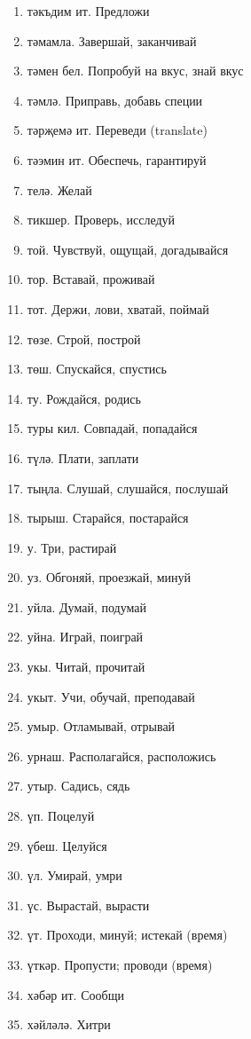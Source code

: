 \documentclass{article}
\begin{document}
\begin{enumerate}
    \item тәкъдим ит. Предложи
    \item тәмамла. Завершай, заканчивай
    \item тәмен бел. Попробуй на вкус, знай вкус
    \item тәмлә. Приправь, добавь специи
    \item тәрҗемә ит. Переведи (translate)
    \item тәэмин ит. Обеспечь, гарантируй
    \item телә. Желай
    \item тикшер. Проверь, исследуй
    \item той. Чувствуй, ощущай, догадывайся
    \item тор. Вставай, проживай
    \item тот. Держи, лови, хватай, поймай
    \item төзе. Строй, построй
    \item төш. Спускайся, спустись
    \item ту. Рождайся, родись
    \item туры кил. Совпадай, попадайся
    \item түлә. Плати, заплати
    \item тыңла. Слушай, слушайся, послушай
    \item тырыш. Старайся, постарайся
    \item у. Три, растирай
    \item уз. Обгоняй, проезжай, минуй
    \item уйла. Думай, подумай
    \item уйна. Играй, поиграй
    \item укы. Читай, прочитай
    \item укыт. Учи, обучай, преподавай
    \item умыр. Отламывай, отрывай
    \item урнаш. Располагайся, расположись
    \item утыр. Садись, сядь
    \item үп. Поцелуй
    \item үбеш. Целуйся
    \item үл. Умирай, умри
    \item үс. Вырастай, вырасти
    \item үт. Проходи, минуй; истекай (время)
    \item үткәр. Пропусти; проводи (время)
    \item хәбәр ит. Сообщи
    \item хәйләлә. Хитри

\end{enumerate}
\end{document}
